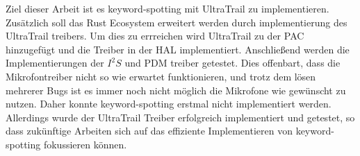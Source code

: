 Ziel dieser Arbeit ist es keyword-spotting mit UltraTrail zu implementieren.
Zusätzlich soll das Rust Ecosystem erweitert werden durch implementierung des UltraTrail treibers.
Um dies zu errreichen wird UltraTrail zu der PAC hinzugefügt und die Treiber in der HAL implementiert.
Anschließend werden die Implementierungen der $I^2S$ und PDM treiber getestet.
Dies offenbart, dass die Mikrofontreiber nicht so wie erwartet funktionieren,
und trotz dem lösen mehrerer Bugs ist es immer noch nicht möglich die Mikrofone wie gewünscht
zu nutzen.
Daher konnte keyword-spotting erstmal nicht implementiert werden.
Allerdings wurde der UltraTrail Treiber erfolgreich implementiert und getestet,
so dass zukünftige Arbeiten sich auf das effiziente Implementieren von keyword-spotting
fokussieren können.
